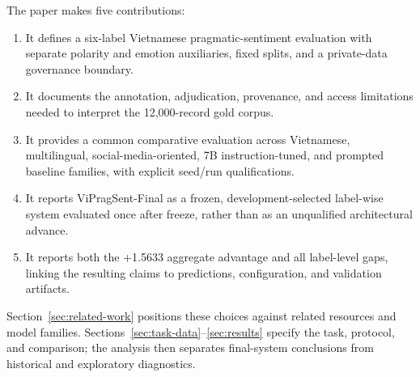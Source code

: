 The paper makes five contributions:
\begin{enumerate}
  \item It defines a six-label Vietnamese pragmatic-sentiment evaluation with separate polarity and emotion auxiliaries, fixed splits, and a private-data governance boundary.
  \item It documents the annotation, adjudication, provenance, and access limitations needed to interpret the 12,000-record gold corpus.
  \item It provides a common comparative evaluation across Vietnamese, multilingual, social-media-oriented, 7B instruction-tuned, and prompted baseline families, with explicit seed/run qualifications.
  \item It reports ViPragSent-Final as a frozen, development-selected label-wise system evaluated once after freeze, rather than as an unqualified architectural advance.
  \item It reports both the +1.5633 aggregate advantage and all label-level gaps, linking the resulting claims to predictions, configuration, and validation artifacts.
\end{enumerate}

Section~\ref{sec:related-work} positions these choices against related resources and model families. Sections~\ref{sec:task-data}--\ref{sec:results} specify the task, protocol, and comparison; the analysis then separates final-system conclusions from historical and exploratory diagnostics.
